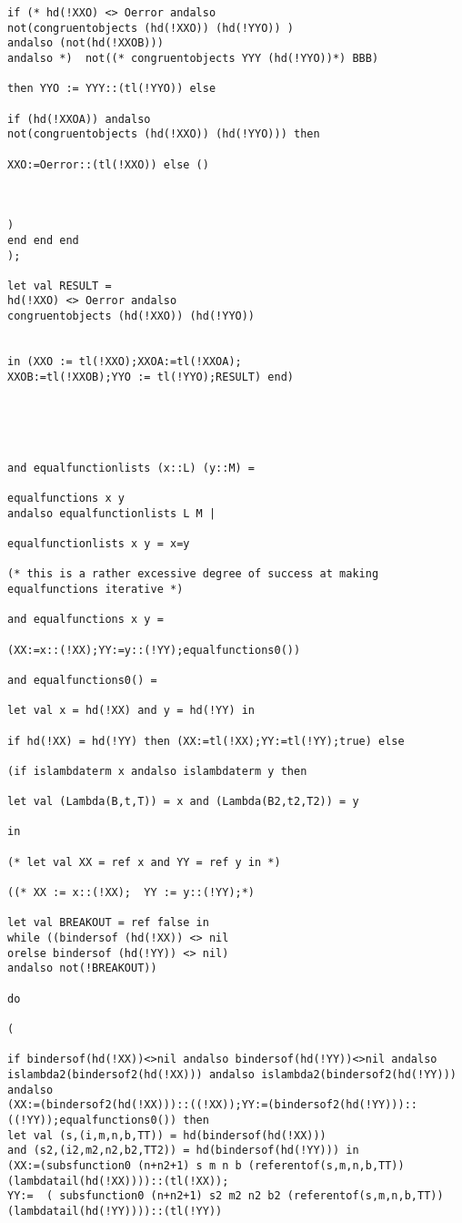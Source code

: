 \documentclass[12pt]{article}
\begin{document}
\begin{verbatim}
if (* hd(!XXO) <> Oerror andalso 
not(congruentobjects (hd(!XXO)) (hd(!YYO)) )
andalso (not(hd(!XXOB)))
andalso *)  not((* congruentobjects YYY (hd(!YYO))*) BBB)

then YYO := YYY::(tl(!YYO)) else 

if (hd(!XXOA)) andalso 
not(congruentobjects (hd(!XXO)) (hd(!YYO))) then

XXO:=Oerror::(tl(!XXO)) else ()

 

)
end end end
);
 
let val RESULT = 
hd(!XXO) <> Oerror andalso
congruentobjects (hd(!XXO)) (hd(!YYO)) 


in (XXO := tl(!XXO);XXOA:=tl(!XXOA);
XXOB:=tl(!XXOB);YYO := tl(!YYO);RESULT) end)
 




and equalfunctionlists (x::L) (y::M) =

equalfunctions x y
andalso equalfunctionlists L M |

equalfunctionlists x y = x=y

(* this is a rather excessive degree of success at making
equalfunctions iterative *)

and equalfunctions x y =

(XX:=x::(!XX);YY:=y::(!YY);equalfunctions0())

and equalfunctions0() =

let val x = hd(!XX) and y = hd(!YY) in

if hd(!XX) = hd(!YY) then (XX:=tl(!XX);YY:=tl(!YY);true) else

(if islambdaterm x andalso islambdaterm y then

let val (Lambda(B,t,T)) = x and (Lambda(B2,t2,T2)) = y

in

(* let val XX = ref x and YY = ref y in *)

((* XX := x::(!XX);  YY := y::(!YY);*)

let val BREAKOUT = ref false in
while ((bindersof (hd(!XX)) <> nil 
orelse bindersof (hd(!YY)) <> nil) 
andalso not(!BREAKOUT))

do

(

if bindersof(hd(!XX))<>nil andalso bindersof(hd(!YY))<>nil andalso
islambda2(bindersof2(hd(!XX))) andalso islambda2(bindersof2(hd(!YY))) andalso
(XX:=(bindersof2(hd(!XX)))::((!XX));YY:=(bindersof2(hd(!YY)))::((!YY));equalfunctions0()) then
let val (s,(i,m,n,b,TT)) = hd(bindersof(hd(!XX)))
and (s2,(i2,m2,n2,b2,TT2)) = hd(bindersof(hd(!YY))) in 
(XX:=(subsfunction0 (n+n2+1) s m n b (referentof(s,m,n,b,TT))(lambdatail(hd(!XX))))::(tl(!XX));
YY:=  ( subsfunction0 (n+n2+1) s2 m2 n2 b2 (referentof(s,m,n,b,TT))   (lambdatail(hd(!YY))))::(tl(!YY)) 


\end{verbatim}
\end{document}
